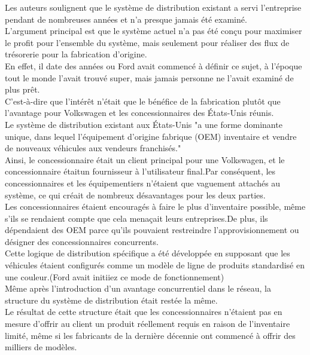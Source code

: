 \documentclass{ceri}
\begin{document}
Les auteurs soulignent que le système de distribution existant a servi l'entreprise pendant de nombreuses années et n'a presque jamais été examiné.\\
L'argument principal est que le système actuel n'a pas été conçu pour maximiser le profit pour l'ensemble du système, mais seulement pour réaliser des flux de trésorerie pour la fabrication d'origine.\\
En effet, il date des années ou Ford avait commencé à définir ce sujet, à l'époque tout le monde l'avait trouvé super, mais jamais personne ne l'avait examiné de plus prêt.\\


C'est-à-dire que l'intérêt n'était que le bénéfice de la fabrication plutôt que l'avantage pour Volkswagen et les concessionnaires des États-Unis réunis.\\
Le système de distribution existant aux États-Unis "a une forme dominante unique, dans lequel l'équipement d'origine fabrique (OEM) inventaire et vendre de nouveaux véhicules aux vendeurs franchisés." \\
Ainsi, le concessionnaire était un client principal pour une Volkswagen, et le concessionnaire étaitun fournisseur à l'utilisateur final.Par conséquent, les concessionnaires et les équipementiers n'étaient que vaguement attachés au système, ce qui créait de nombreux désavantages pour les deux parties.\\


Les concessionnaires étaient encouragés à faire le plus d'inventaire possible, même s'ils se rendaient compte que cela menaçait leurs entreprises.De plus, ils dépendaient des OEM parce qu'ils pouvaient restreindre l'approvisionnement ou désigner des concessionnaires concurrents.\\
Cette logique de distribution spécifique a été développée en supposant que les véhicules étaient configurés comme un modèle de ligne de produits standardisé en une couleur.(Ford avait initiiez ce mode de fonctionnement)\\


Même après l'introduction d'un avantage concurrentiel dans le réseau, la structure du système de distribution était restée la même.\\
Le résultat de cette structure était que les concessionnaires n'étaient pas en mesure d'offrir au client un produit réellement requis en raison de l'inventaire limité, même si les fabricants de la dernière décennie ont commencé à offrir des milliers de modèles.\\
\end{document}

